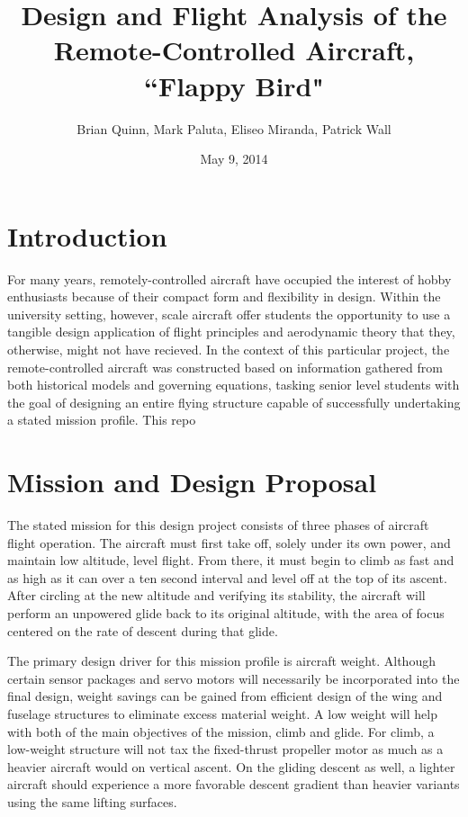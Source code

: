 \documentclass[titlepage]{article}
\begin{document}
\title{\textbf{Design and Flight Analysis of the Remote-Controlled Aircraft, ``Flappy Bird"}}
\author{Brian Quinn, Mark Paluta, Eliseo Miranda, Patrick Wall}
\date{May 9, 2014}
\maketitle

\section{Introduction}
For many years, remotely-controlled aircraft have occupied the interest of hobby enthusiasts because of their compact form and flexibility in design. Within the university setting, however, scale aircraft offer students the opportunity to use a tangible design application of flight principles and aerodynamic theory that they, otherwise, might not have recieved. In the context of this particular project, the remote-controlled aircraft was constructed based on information gathered from both historical models and governing equations, tasking senior level students with the goal of designing an entire flying structure capable of successfully undertaking a stated mission profile. This repo

\section{Mission and Design Proposal}
The stated mission for this design project consists of three phases of aircraft flight operation. The aircraft must first take off, solely under its own power, and maintain low altitude, level flight. From there, it must begin to climb as fast and as high as it can over a ten second interval and level off at the top of its ascent. After circling at the new altitude and verifying its stability, the aircraft will perform an unpowered glide back to its original altitude, with the area of focus centered on the rate of descent during that glide.  

The primary design driver for this mission profile is aircraft weight. Although certain sensor packages and servo motors will necessarily be incorporated into the final design, weight savings can be gained from efficient design of the wing and fuselage structures to eliminate excess material weight. A low weight will help with both of the main objectives of the mission, climb and glide. For climb, a low-weight structure will not tax the fixed-thrust propeller motor as much as a heavier aircraft would on vertical ascent. On the gliding descent as well, a lighter aircraft should experience a more favorable descent gradient than heavier variants using the same lifting surfaces.
\end{document}
